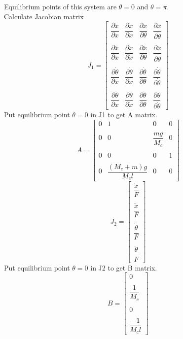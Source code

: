 \documentclass[a4paper,12pt]{article}
\begin{document}
Equilibrium points of this system are $\theta=0$ and $\theta=\pi$.\\
Calculate Jacobian matrix
\begin{equation*}
J_1 = 
\begin{bmatrix}
\dfrac{\partial\dot{x}}{\partial x} & \dfrac{\partial\dot{x}}{\partial\dot{x}} & \dfrac{\partial\dot{x}}{\partial\theta} & \dfrac{\partial\dot{x}}{\partial\dot{\theta}}\\\\
\dfrac{\partial\ddot{x}}{\partial x} & \dfrac{\partial\ddot{x}}{\partial\dot{x}} & \dfrac{\partial\ddot{x}}{\partial\theta} & \dfrac{\partial\ddot{x}}{\partial\dot{\theta}}\\\\
\dfrac{\partial\dot{\theta}}{\partial x} & \dfrac{\partial\dot{\theta}}{\partial\dot{x}} & \dfrac{\partial\dot{\theta}}{\partial\theta} & \dfrac{\partial\dot{\theta}}{\partial\dot{\theta}}\\\\
\dfrac{\partial\ddot{\theta}}{\partial x} & \dfrac{\partial\ddot{\theta}}{\partial\dot{x}} & \dfrac{\partial\ddot{\theta}}{\partial\theta} & \dfrac{\partial\ddot{\theta}}{\partial\dot{\theta}}
\end{bmatrix}
\end{equation*}
Put equilibrium point $\theta=0$ in J1 to get A matrix.
\begin{equation}
A =
\begin{bmatrix}
0 & 1 & 0 & 0\\\\
0 & 0 & \dfrac{mg}{M_c} & 0\\\\
0 & 0 & 0 & 1\\\\
0 & \dfrac{(M_c+m)g}{M_cl} & 0 & 0
\end{bmatrix}
\end{equation}
\begin{equation*}
J_2 = 
\begin{bmatrix}
\dfrac{\dot{x}}{F}\\\\
\dfrac{\ddot{x}}{F}\\\\
\dfrac{\dot{\theta}}{F}\\\\
\dfrac{\ddot{\theta}}{F}
\end{bmatrix}
\end{equation*}
Put equilibrium point $\theta=0$ in J2 to get B matrix.
\begin{equation}
B = 
\begin{bmatrix}
0\\\\
\dfrac{1}{M_c}\\\\
0\\\\
\dfrac{-1}{M_cl}
\end{bmatrix}
\end{equation}
\end{document}

